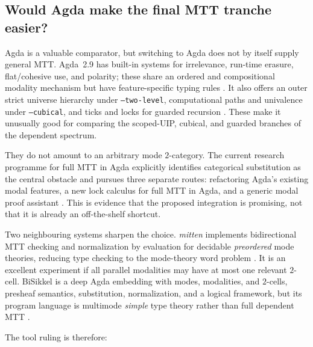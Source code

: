 \documentclass[11pt]{article}
\theoremstyle{definition}
\theoremstyle{remark}
\newcommand{\code}[1]{\texttt{#1}}
\begin{document}
\subsection{Would Agda make the final MTT tranche easier?}

Agda is a valuable comparator, but switching to Agda does not by itself supply
general MTT.  Agda~2.9 has built-in systems for irrelevance, run-time erasure,
flat/cohesive use, and polarity; these share an ordered and compositional
modality mechanism but have feature-specific typing rules
\cite{AgdaModalities}.  It also offers an outer strict universe hierarchy under
\code{--two-level}, computational paths and univalence under
\code{--cubical}, and ticks and locks for guarded recursion
\cite{AgdaTwoLevel,AgdaCubical,AgdaGuarded}.  These make it unusually good for
comparing the scoped-UIP, cubical, and guarded branches of the dependent
spectrum.

They do not amount to an arbitrary mode $2$-category.  The current research
programme for full MTT in Agda explicitly identifies categorical substitution
as the central obstacle and pursues three separate routes: refactoring Agda's
existing modal features, a new lock calculus for full MTT in Agda, and a generic
modal proof assistant \cite{KULeuvenMTTPrinciples,KULeuvenMTTAgda}.  This is
evidence that the proposed integration is promising, not that it is already an
off-the-shelf shortcut.

Two neighbouring systems sharpen the choice.  \emph{mitten} implements
bidirectional MTT checking and normalization by evaluation for decidable
\emph{preordered} mode theories, reducing type checking to the mode-theory word
problem \cite{StassenGratzerBirkedalMitten}.  It is an excellent experiment if
all parallel modalities may have at most one relevant $2$-cell.  BiSikkel is a
deep Agda embedding with modes, modalities, and $2$-cells, presheaf semantics,
substitution, normalization, and a logical framework, but its program language
is multimode \emph{simple} type theory rather than full dependent MTT
\cite{CeulemansNuytsDevrieseSikkel,BiSikkel}.

The tool ruling is therefore:
\end{document}
